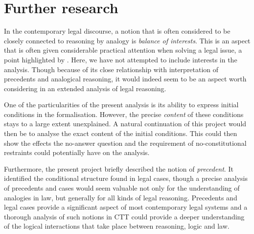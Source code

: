 	\section{Further research}
	
		In the contemporary legal discourse, a notion that is often considered to be closely connected to reasoning by analogy is \textit{balance of interests}. This is an aspect that is often given considerable practical attention when solving a legal issue, a point highlighted by \textcite{armgardt2022formal}. Here, we have not attempted to include interests in the analysis. Though because of its close relationship with interpretation of precedents and analogical reasoning, it would indeed seem to be an aspect worth considering in an extended analysis of legal reasoning.
		
		One of the particularities of the present analysis is its ability to express initial conditions in the formalisation. However, the precise \textit{content} of these conditions stays to a large extent unexplained. A natural continuation of this project would then be to analyse the exact content of the initial conditions. This could then show the effects the no-answer question and the requirement of no-constitutional restraints could potentially have on the analysis. 
		
		Furthermore, the present project briefly described the notion of \textit{precedent}. It identified the conditional structure found in legal cases, though a precise analysis of precedents and cases would seem valuable not only for the understanding of analogies in law, but generally for all kinds of legal reasoning. Precedents and legal cases provide a significant aspect of most contemporary legal systems and a thorough analysis of such notions in CTT could provide a deeper understanding of the logical interactions that take place between reasoning, logic and law. 
	
	
	
	
	
	
	
	
	
	
	
